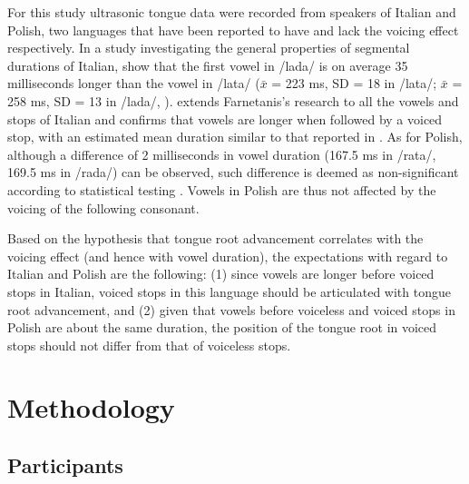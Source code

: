 \documentclass[authoryear, twocolumn]{elsarticle}
\begin{document}
For this study ultrasonic tongue data were recorded from speakers of
Italian and Polish, two languages that have been reported to have and
lack the voicing effect respectively. In a study investigating the
general properties of segmental durations of Italian,
\citet{farnetani1986} show that the first vowel in /lada/ is on average
35 milliseconds longer than the vowel in /lata/ (\(\bar{x}\) = 223 ms,
SD = 18 in /lata/; \(\bar{x}\) = 258 ms, SD = 13 in /lada/,
\citealt[26]{farnetani1986}). \citet{esposito2002} extends Farnetanis's
research to all the vowels and stops of Italian and confirms that vowels
are longer when followed by a voiced stop, with an estimated mean
duration similar to that reported in \citet{farnetani1986}. As for
Polish, although a difference of 2 milliseconds in vowel duration (167.5
ms in /rata/, 169.5 ms in /rada/) can be observed, such difference is
deemed as non-significant according to statistical testing
\citep{keating1984}. Vowels in Polish are thus not affected by the
voicing of the following consonant.

Based on the hypothesis that tongue root advancement correlates with the
voicing effect (and hence with vowel duration), the expectations with
regard to Italian and Polish are the following: (1) since vowels are
longer before voiced stops in Italian, voiced stops in this language
should be articulated with tongue root advancement, and (2) given that
vowels before voiceless and voiced stops in Polish are about the same
duration, the position of the tongue root in voiced stops should not
differ from that of voiceless stops.

\section{Methodology}\label{methodology}

\subsection{Participants}\label{participants}

\end{document}
